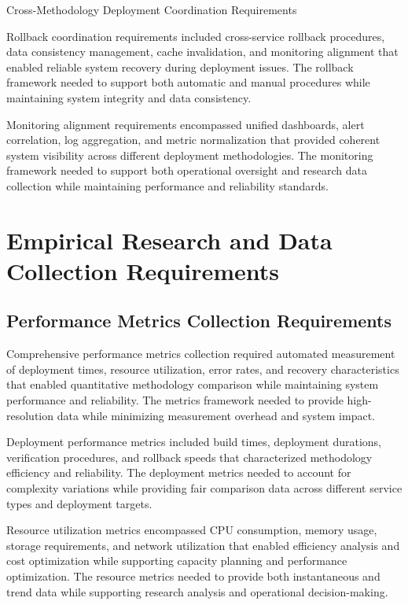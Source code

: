 \begin{table}[H]
\centering
\caption{Cross-Methodology Deployment Coordination Requirements}
\label{tab:cross-methodology-deployment}
\end{table}

Rollback coordination requirements included cross-service rollback procedures, data consistency management, cache invalidation, and monitoring alignment that enabled reliable system recovery during deployment issues. The rollback framework needed to support both automatic and manual procedures while maintaining system integrity and data consistency.

Monitoring alignment requirements encompassed unified dashboards, alert correlation, log aggregation, and metric normalization that provided coherent system visibility across different deployment methodologies. The monitoring framework needed to support both operational oversight and research data collection while maintaining performance and reliability standards.

\section{Empirical Research and Data Collection Requirements}

\subsection{Performance Metrics Collection Requirements}

Comprehensive performance metrics collection required automated measurement of deployment times, resource utilization, error rates, and recovery characteristics that enabled quantitative methodology comparison while maintaining system performance and reliability. The metrics framework needed to provide high-resolution data while minimizing measurement overhead and system impact.

Deployment performance metrics included build times, deployment durations, verification procedures, and rollback speeds that characterized methodology efficiency and reliability. The deployment metrics needed to account for complexity variations while providing fair comparison data across different service types and deployment targets.

Resource utilization metrics encompassed CPU consumption, memory usage, storage requirements, and network utilization that enabled efficiency analysis and cost optimization while supporting capacity planning and performance optimization. The resource metrics needed to provide both instantaneous and trend data while supporting research analysis and operational decision-making.

